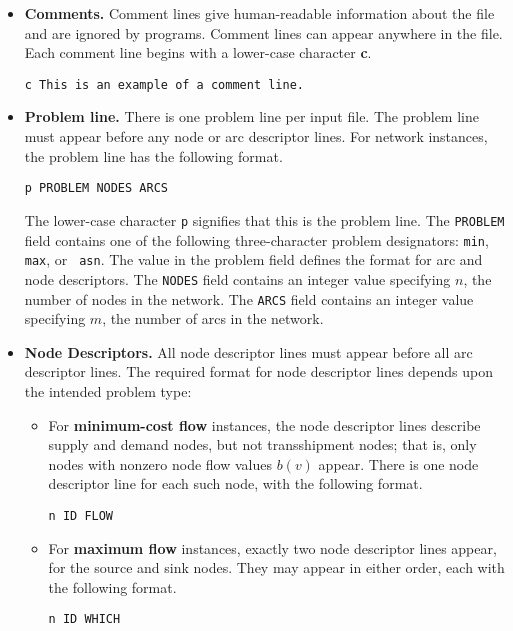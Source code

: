 \begin{itemize}

\item {\bf Comments.} Comment lines give human-readable 
information about the file and are ignored by programs.  Comment lines
can appear anywhere in the file.  Each comment line begins with a
lower-case character {\bf c}.
\begin{verbatim} 
c This is an example of a comment line.
\end{verbatim} 

\item {\bf Problem line.}  There is one problem line per input file.  The 
problem line must appear before any node or arc descriptor lines.  For
network instances, the problem line has the following format.
\begin{verbatim}
p PROBLEM NODES ARCS
\end{verbatim} 
The lower-case character {\tt p} signifies that this is the problem
line.  The {\tt PROBLEM} field contains one of the following
three-character problem designators: {\tt min}, {\tt max}, or {\tt
asn}.  The value in the problem field defines the format for arc and
node descriptors.  The {\tt NODES} field contains an integer value
specifying $n$, the number of nodes in the network.  The {\tt ARCS}
field contains an integer value specifying $m$, the number of arcs in
the network.

\item {\bf Node Descriptors.}   
All node descriptor lines must appear before all arc descriptor lines.
The required format for node descriptor lines depends upon the
intended problem type: 
\begin{itemize}
\item For {\bf minimum-cost flow} instances, the node descriptor 
lines describe supply and demand nodes, but not transshipment nodes;
that is, only nodes with nonzero node flow values $b(v)$ appear.
There is one node descriptor line for each such node, with the
following format.
\begin{verbatim}
n ID FLOW
\end{verbatim}

\item For {\bf maximum flow} instances, exactly two node descriptor 
lines appear, for the source and sink nodes.  They may appear in
either order, each with the following format.
\begin{verbatim}
n ID WHICH
\end{verbatim} 


\end{itemize}
\end{itemize}
